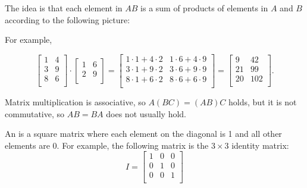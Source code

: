 The idea is that each element in $AB$
is a sum of products of elements in $A$ and $B$
according to the following picture:

\begin{center}
\end{center}

For example,

\[
 \begin{bmatrix}
  1 & 4 \\
  3 & 9 \\
  8 & 6 \\
 \end{bmatrix}
\cdot
 \begin{bmatrix}
  1 & 6 \\
  2 & 9 \\
 \end{bmatrix}
=
 \begin{bmatrix}
  1 \cdot 1 + 4 \cdot 2 & 1 \cdot 6 + 4 \cdot 9 \\
  3 \cdot 1 + 9 \cdot 2 & 3 \cdot 6 + 9 \cdot 9 \\
  8 \cdot 1 + 6 \cdot 2 & 8 \cdot 6 + 6 \cdot 9 \\
 \end{bmatrix}
=
 \begin{bmatrix}
  9 & 42 \\
  21 & 99 \\
  20 & 102 \\
 \end{bmatrix}.
\]

Matrix multiplication is associative,
so $A(BC)=(AB)C$ holds,
but it is not commutative,
so $AB = BA$ does not usually hold.


An  is a square matrix
where each element on the diagonal is 1
and all other elements are 0.
For example, the following matrix
is the $3 \times 3$ identity matrix:
\[
 I = \begin{bmatrix}
  1 & 0 & 0 \\
  0 & 1 & 0 \\
  0 & 0 & 1 \\
 \end{bmatrix}
\]


